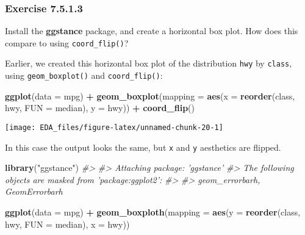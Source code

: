 \documentclass[]{book}
\newenvironment{Shaded}{\begin{snugshade}}{\end{snugshade}}
\newcommand{\CommentTok}[1]{\textcolor[rgb]{0.56,0.35,0.01}{\textit{#1}}}
\newcommand{\DataTypeTok}[1]{\textcolor[rgb]{0.13,0.29,0.53}{#1}}
\newcommand{\KeywordTok}[1]{\textcolor[rgb]{0.13,0.29,0.53}{\textbf{#1}}}
\newcommand{\NormalTok}[1]{#1}
\newcommand{\OperatorTok}[1]{\textcolor[rgb]{0.81,0.36,0.00}{\textbf{#1}}}
\newcommand{\StringTok}[1]{\textcolor[rgb]{0.31,0.60,0.02}{#1}}
\theoremstyle{plain}
\theoremstyle{remark}
\theoremstyle{definition}
\theoremstyle{definition}
\theoremstyle{definition}
\theoremstyle{remark}
\begin{document}
\hypertarget{exercise-7.5.1.3}{%
\subsubsection*{\texorpdfstring{Exercise
{7.5.1.3}}{Exercise 7.5.1.3}}\label{exercise-7.5.1.3}}

Install the \textbf{ggstance} package, and create a horizontal box plot.
How does this compare to using \texttt{coord\_flip()}?

Earlier, we created this horizontal box plot of the distribution
\texttt{hwy} by \texttt{class}, using \texttt{geom\_boxplot()} and
\texttt{coord\_flip()}:

\begin{Shaded}
\begin{Highlighting}[]
\KeywordTok{ggplot}\NormalTok{(}\DataTypeTok{data =}\NormalTok{ mpg) }\OperatorTok{+}
\StringTok{  }\KeywordTok{geom_boxplot}\NormalTok{(}\DataTypeTok{mapping =} \KeywordTok{aes}\NormalTok{(}\DataTypeTok{x =} \KeywordTok{reorder}\NormalTok{(class, hwy, }\DataTypeTok{FUN =}\NormalTok{ median), }\DataTypeTok{y =}\NormalTok{ hwy)) }\OperatorTok{+}
\StringTok{  }\KeywordTok{coord_flip}\NormalTok{()}
\end{Highlighting}
\end{Shaded}

\begin{center}\texttt{[image: EDA\_files/figure-latex/unnamed-chunk-20-1]} \end{center}

In this case the output looks the same, but \texttt{x} and \texttt{y}
aesthetics are flipped.

\begin{Shaded}
\begin{Highlighting}[]
\KeywordTok{library}\NormalTok{(}\StringTok{"ggstance"}\NormalTok{)}
\CommentTok{#> }
\CommentTok{#> Attaching package: 'ggstance'}
\CommentTok{#> The following objects are masked from 'package:ggplot2':}
\CommentTok{#> }
\CommentTok{#>     geom_errorbarh, GeomErrorbarh}

\KeywordTok{ggplot}\NormalTok{(}\DataTypeTok{data =}\NormalTok{ mpg) }\OperatorTok{+}
\StringTok{  }\KeywordTok{geom_boxploth}\NormalTok{(}\DataTypeTok{mapping =} \KeywordTok{aes}\NormalTok{(}\DataTypeTok{y =} \KeywordTok{reorder}\NormalTok{(class, hwy, }\DataTypeTok{FUN =}\NormalTok{ median), }\DataTypeTok{x =}\NormalTok{ hwy))}
\end{Highlighting}
\end{Shaded}
\end{document}
